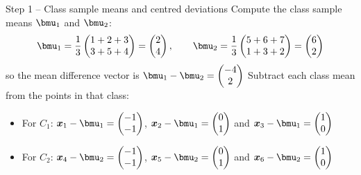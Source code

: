 \documentclass[aspectratio=169]{beamer}\usepackage[]{graphicx}\usepackage[]{xcolor}
\begin{document}
\begin{frame}{Step 1 -- Class sample means and centred deviations}
    Compute the class sample means $\bmu_1$ and $\bmu_2$:
    \[
        \bmu_1 = \frac{1}{3}\begin{pmatrix} 1 + 2 + 3 \\ 3 + 5 + 4 \end{pmatrix} = \begin{pmatrix} 2 \\ 4 \end{pmatrix}, \qquad
        \bmu_2 = \frac{1}{3}\begin{pmatrix} 5 + 6 + 7 \\ 1 + 3 + 2 \end{pmatrix} = \begin{pmatrix} 6 \\ 2 \end{pmatrix}
    \]
    so the mean difference vector is $\bmu_1 - \bmu_2 = \begin{pmatrix} -4 \\ 2 \end{pmatrix}$
    \vfill
    Subtract each class mean from the points in that class:
    \begin{itemize}
        \item For $C_1$: $\bx_1 - \bmu_1 = \begin{pmatrix} -1 \\ -1 \end{pmatrix}$, $\bx_2 - \bmu_1 = \begin{pmatrix} 0 \\ 1 \end{pmatrix}$ and $\bx_3 - \bmu_1 = \begin{pmatrix} 1 \\ 0 \end{pmatrix}$
        \item For $C_2$: $\bx_4 - \bmu_2 = \begin{pmatrix} -1 \\ -1 \end{pmatrix}$, $\bx_5 - \bmu_2 = \begin{pmatrix} 0 \\ 1 \end{pmatrix}$ and $\bx_6 - \bmu_2 = \begin{pmatrix} 1 \\ 0 \end{pmatrix}$
    \end{itemize}
\end{frame}
\end{document}
